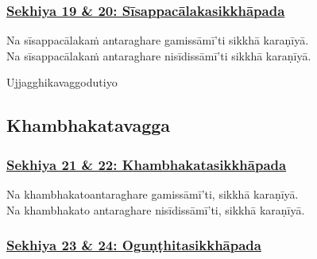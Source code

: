 \subsubsection*{\hyperref[training19-20]{Sekhiya 19 \& 20: Sīsappacālakasikkhāpada}}
\label{sekh19-20}

Na sīsappacālakaṁ antaraghare gamissāmī'ti sikkhā karaṇīyā.\\
Na sīsappacālakaṁ antaraghare nisīdissāmī'ti sikkhā karaṇīyā.

\begin{center}
	Ujjagghikavaggo\makeatletter\hyperlink{endnote476-appendix}\makeatother \thinspace dutiyo\makeatletter\hyperlink{endnote477-appendix}\makeatother \thinspace
\end{center}



\subsection{Khambhakatavagga}

\subsubsection*{\hyperref[training21-22]{Sekhiya 21 \& 22: Khambhakatasikkhāpada}}
\label{sekh21-22}

Na khambhakato\makeatletter\hyperlink{endnote478-appendix}\makeatother \thinspace antaraghare gamissāmī'ti, sikkhā karaṇīyā.\\
Na khambhakato antaraghare nisīdissāmī'ti, sikkhā karaṇīyā.



\subsubsection*{\hyperref[training23-24]{Sekhiya 23 \& 24: Oguṇṭhitasikkhāpada}}
\label{sekh23-24}

